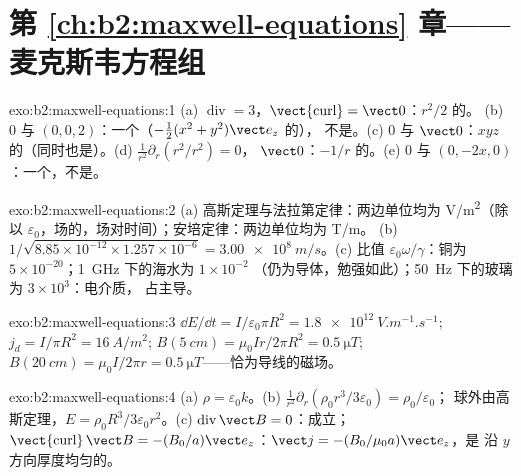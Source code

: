 \section*{第 \ref{ch:b2:maxwell-equations} 章——麦克斯韦方程组}

\begin{solution}{exo:b2:maxwell-equations:1}
(a) $\operatorname{div} = 3$，$\operatorname{\vect{curl}} = \vect 0$：$r^2/2$ 的。
(b) $0$ 与 $(0, 0, 2)$：一个（$-\tfrac12(x^2 + y^2)\vect e_z$ 的），
不是。(c) $0$ 与 $\vect 0$：$xyz$ 的（同时也是）。(d)
$\frac1{r^2}\partial_r(r^2/r^2) = 0$， $\vect 0$：$-1/r$ 的。(e)
$0$ 与 $(0, -2x, 0)$：一个，不是。
\end{solution}

\begin{solution}{exo:b2:maxwell-equations:2}
(a) 高斯定理与法拉第定律：两边单位均为 \unit{V/m^2}（除以
$\varepsilon_0$，场的，场对时间）；安培定律：两边单位均为
\unit{T/m}。
(b) $1/\sqrt{8.85 \times 10^{-12} \times 1.257 \times 10^{-6}} = \qty{3.00e8}{m/s}$。(c) 比值
$\varepsilon_0\omega/\gamma$：铜为 $5 \times 10^{-20}$；\qty{1}{GHz} 下的海水为 $1 \times 10^{-2}$
（仍为导体，勉强如此）；\qty{50}{Hz} 下的玻璃为 $3 \times 10^3$：电介质，
占主导。
\end{solution}

\begin{solution}{exo:b2:maxwell-equations:3}
$\dd E/\dd t = I/\varepsilon_0\pi R^2 = \qty{1.8e12}{V.m^{-1}.s^{-1}}$; $j_d = I/\pi R^2 =
\qty{16}{A/m^2}$; $B(\qty{5}{cm}) = \mu_0Ir/2\pi R^2 = \qty{0.5}{\micro T}$; $B(\qty{20}{cm}) =
\mu_0I/2\pi r = \qty{0.5}{\micro T}$——恰为导线的磁场。
\end{solution}

\begin{solution}{exo:b2:maxwell-equations:4}
(a) $\rho = \varepsilon_0k$。(b) $\frac1{r^2}\partial_r(\rho_0r^3/3\varepsilon_0) = \rho_0/\varepsilon_0$；
球外由高斯定理，$E = \rho_0R^3/3\varepsilon_0r^2$。(c) $\operatorname{div}\vect B = 0$：成立；
$\operatorname{\vect{curl}}\vect B = -(B_0/a)\vect e_z$：$\vect j = -(B_0/\mu_0a)\vect e_z$，是
沿 $y$ 方向厚度均匀的。
\end{solution}


